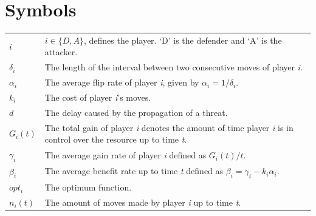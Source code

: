 \documentclass[master=cws, masteroption=vs,english]{kulemt}
\begin{document}
\section*{Symbols}
\begin{flushleft}
  \renewcommand{\arraystretch}{1.1}
  \begin{tabularx}{\textwidth}{@{}p{12mm}X@{}}
 $i$ & $i \in \{D,A\}$, defines the player. `D' is the defender and `A' is the attacker. \\
 $\delta_{i}$ & The length of the interval between two consecutive moves of player \textit{i}. \\
 $\alpha_{i}$ & The average flip rate of player \textit{i}, given by $\alpha_{i}=1/\delta_{i}$. \\
$k_{i}$ & The cost of player \textit{i}'s moves. \\
$d$ & The delay caused by the propagation of a threat. \\
 $G_{i}(t)$ & The total gain of player \textit{i} denotes the amount of time player \textit{i} is in control over the resource up to time \textit{t}. \\
$\gamma_{i}$ & The average gain rate of player \textit{i} defined as $G_{i}(t)/t$. \\
$\beta_{i}$ &  The average benefit rate up to time \textit{t} defined as  $\beta_{i} = \gamma_{i} -k_{i} \alpha_{i} $. \\
$opt_{i}$ & The optimum function. \\
$n_{i}(t)$ & The amount of moves made by player \textit{i} up to time \textit{t}. \\
  \end{tabularx}
\end{flushleft}

\mainmatter

%


%







%
%
%
%
%


%
%

\backmatter


\end{document}
